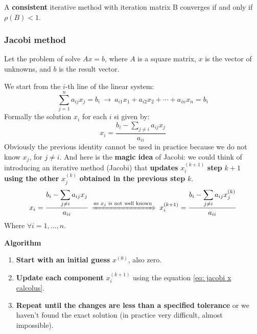 \highspace
\begin{theorem}
    A \textbf{consistent} iterative method with iteration matrix B converges if and only if $\rho\left(B\right) < 1$.
\end{theorem}

\newpage

\subsubsection{Jacobi method}

Let the problem of solve $Ax = b$, where $A$ is a square matrix, $x$ is the vector of unknowns, and $b$ is the result vector.

\highspace
We start from the $i$-th line of the linear system:
\begin{equation*}
    \displaystyle\sum_{j = 1}^{n} a_{ij}x_{j} = b_{i} \: \rightarrow \: a_{i1}x_{1} + a_{i2}x_{2} + \cdots + a_{in}x_{n} = b_{i}
\end{equation*}
Formally the solution $x_{i}$ for each $i$ si given by:
\begin{equation}
    x_{i} = \dfrac{b_{i}-\displaystyle\sum_{j \ne i} a_{ij}x_{j}}{a_{ii}}
\end{equation}
Obviously the previous identity cannot be used in practice because we do not know $x_{j}$, for $j \ne i$. And here is the \textbf{magic idea} of Jacobi: we could think of introducing an iterative method (Jacobi) that \textbf{updates} $x_{i}^{\left(k+1\right)}$ \textbf{step} $k+1$ \textbf{using the other} $x_{j}^{\left(k\right)}$ \textbf{obtained in the previous step} $k$.
\begin{equation}\label{eq: jacobi x calcolus}
    x_{i} = \dfrac{b_{i}-\displaystyle\sum_{j \ne i} a_{ij}x_{j}}{a_{ii}} \: \xRightarrow{\text{as }x_{j}\text{ is not well known}} \: x_{i}^{\left(k+1\right)} = \dfrac{b_{i}-\displaystyle\sum_{j \ne i} a_{ij}x_{j}^{\left(k\right)}}{a_{ii}}
\end{equation}
Where $\forall i = 1, \dots, n$.

\highspace
\begin{flushleft}
    \textcolor{Green3}{ \textbf{Algorithm}}
\end{flushleft}
\begin{enumerate}
    \item \textbf{Start with an initial guess} $x^{\left(0\right)}$, also zero.
    \item \textbf{Update each component} $x_{i}^{\left(k+1\right)}$ using the equation \ref{eq: jacobi x calcolus}.
    \item \textbf{Repeat until the changes are less than a specified tolerance} or we haven't found the exact solution (in practice very difficult, almost impossible).
\end{enumerate}

